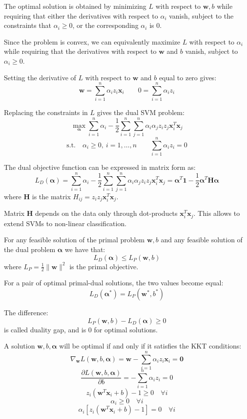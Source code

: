 The optimal solution is obtained by minimizing $L$ with respect to $\mathbf{w}, b$ while requiring
that either the derivatives with respect to $\alpha_i$ vanish, subject to the constraints that
$\alpha_i \geq 0$, or the corresponding $\alpha_i$ is 0.

Since the problem is convex, we can equivalently maximize $L$ with respect to $\alpha_i$ while
requiring that the derivatives with respect to $\mathbf{w}$ and $b$ vanish, subject to $\alpha_i \geq 0$.

Setting the derivative of $L$ with respect to $\mathbf{w}$ and $b$ equal to zero gives:
\[
\mathbf{w} = \sum_{i=1}^n \alpha_i z_i \mathbf{x}_i \qquad 0 = \sum_{i=1}^n \alpha_i z_i
\]

Replacing the constraints in $L$ gives the dual SVM problem:
\[
\max_{\boldsymbol{\alpha}} \sum_{i=1}^n \alpha_i - \frac{1}{2} \sum_{i=1}^n \sum_{j=1}^n \alpha_i \alpha_j z_i z_j \mathbf{x}_i^T \mathbf{x}_j
\]
\[
\text{s.t.} \quad \alpha_i \geq 0,\ i = 1,\ldots,n \qquad \sum_{i=1}^n \alpha_i z_i = 0
\]

The dual objective function can be expressed in matrix form as:
\[
L_D(\boldsymbol{\alpha}) = \sum_{i=1}^n \alpha_i - \frac{1}{2}\sum_{i=1}^n\sum_{j=1}^n \alpha_i \alpha_j z_i z_j \mathbf{x}_i^T \mathbf{x}_j = \boldsymbol{\alpha}^T \mathbf{1} - \frac{1}{2}\boldsymbol{\alpha}^T \mathbf{H} \boldsymbol{\alpha}
\]
where $\mathbf{H}$ is the matrix $H_{ij} = z_i z_j \mathbf{x}_i^T \mathbf{x}_j$.

Matrix $\mathbf{H}$ depends on the data only through dot-products $\mathbf{x}_i^T \mathbf{x}_j$. This allows to extend
SVMs to non-linear classification.

For any feasible solution of the primal problem $\mathbf{w}, b$ and any feasible solution of the dual
problem $\boldsymbol{\alpha}$ we have that:
\[
L_D(\boldsymbol{\alpha}) \leq L_P(\mathbf{w}, b)
\]
where $L_P = \frac{1}{2}\|\mathbf{w}\|^2$ is the primal objective.

For a pair of optimal primal-dual solutions, the two values become equal:
\[
L_D(\boldsymbol{\alpha}^*) = L_P(\mathbf{w}^*, b^*)
\]

The difference:
\[
L_P(\mathbf{w}, b) - L_D(\boldsymbol{\alpha}) \geq 0
\]
is called duality gap, and is 0 for optimal solutions.

A solution $\mathbf{w}, b, \boldsymbol{\alpha}$ will be optimal if and only if it satisfies the KKT conditions:
\[
\nabla_\mathbf{w} L(\mathbf{w}, b, \boldsymbol{\alpha}) = \mathbf{w} - \sum_{i=1}^n \alpha_i z_i \mathbf{x}_i = \mathbf{0}
\]
\[
\frac{\partial L(\mathbf{w}, b, \boldsymbol{\alpha})}{\partial b} = -\sum_{i=1}^n \alpha_i z_i = 0
\]
\[
z_i\left(\mathbf{w}^T \mathbf{x}_i + b\right) - 1 \geq 0 \quad \forall i
\]
\[
\alpha_i \geq 0 \quad \forall i
\]
\[
\alpha_i \left[ z_i \left( \mathbf{w}^T \mathbf{x}_i + b \right) - 1 \right] = 0 \quad \forall i
\]

